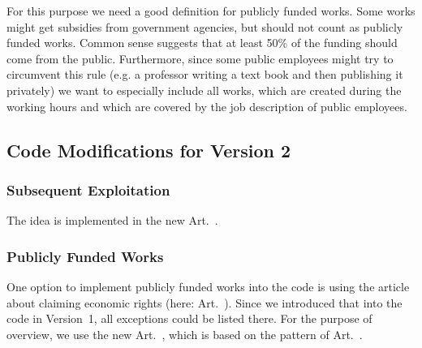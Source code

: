 For this purpose we need a good definition for publicly funded works. Some works might get subsidies from government agencies, but should not count as publicly funded works. Common sense suggests that at least 50\% of the funding should come from the public. Furthermore, since some public employees might try to circumvent this rule (e.g. a professor writing a text book and then publishing it privately) we want to especially include all works, which are created during the working hours and which are covered by the job description of public employees.

\subsection{Code Modifications for Version 2}

\subsubsection{Subsequent Exploitation}

The idea is implemented in the new Art.~.

\subsubsection{Publicly Funded Works}

One option to implement publicly funded works into the code is using the article about claiming economic rights (here: Art.~). Since we introduced that into the code in Version~1, all exceptions could be listed there. For the purpose of overview, we use the new Art.~, which is based on the pattern of Art.~.
